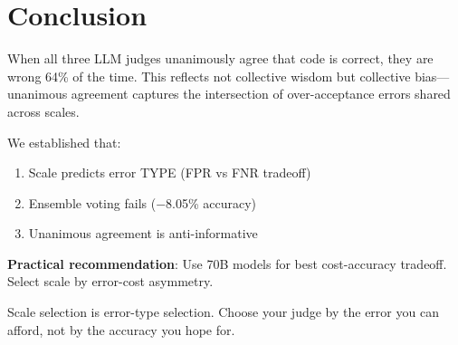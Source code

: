 \section{Conclusion}

When all three LLM judges unanimously agree that code is correct, they are wrong 64\% of the time. This reflects not collective wisdom but collective bias---unanimous agreement captures the intersection of over-acceptance errors shared across scales.

We established that:
\begin{enumerate}
    \item Scale predicts error TYPE (FPR vs FNR tradeoff)
    \item Ensemble voting fails ($-$8.05\% accuracy)
    \item Unanimous agreement is anti-informative
\end{enumerate}

\textbf{Practical recommendation}: Use 70B models for best cost-accuracy tradeoff. Select scale by error-cost asymmetry.

Scale selection is error-type selection. Choose your judge by the error you can afford, not by the accuracy you hope for.
